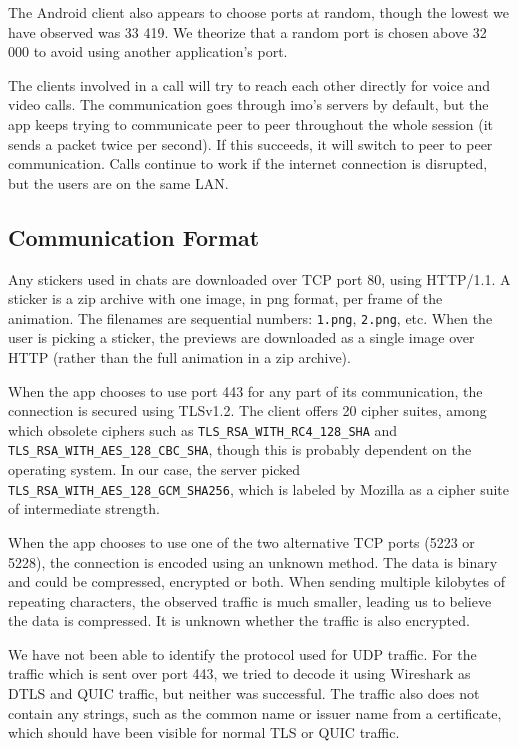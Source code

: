 \documentclass[conference]{IEEEtran}
\begin{document}
The Android client also appears to choose ports at random, though the lowest we
have observed was 33 419. We theorize that a random port is chosen above 32 000
to avoid using another application's port.

The clients involved in a call will try to reach each other directly for voice
and video calls. The communication goes through imo's servers by default, but
the app keeps trying to communicate peer to peer throughout the whole session
(it sends a packet twice per second). If this succeeds, it will switch to peer
to peer communication. Calls continue to work if the internet connection is
disrupted, but the users are on the same LAN.


\subsection{Communication Format}

Any stickers used in chats are downloaded over TCP port 80, using HTTP/1.1. A
sticker is a zip archive with one image, in png format, per frame of the
animation. The filenames are sequential numbers: \texttt{1.png}, \texttt{2.png},
etc. When the user is picking a sticker, the previews are downloaded as a single
image over HTTP (rather than the full animation in a zip archive).

When the app chooses to use port 443 for any part of its communication, the
connection is secured using TLSv1.2. The client offers 20 cipher suites, among
which obsolete ciphers such as \texttt{TLS\_RSA\_WITH\_RC4\_128\_SHA} and
\texttt{TLS\_RSA\_WITH\_AES\_128\_CBC\_SHA}, though this is probably dependent
on the operating system. In our case, the server picked
\texttt{TLS\_RSA\_WITH\_AES\_128\_GCM\_SHA256}, which is labeled by Mozilla as a
cipher suite of intermediate strength\cite{moz-tls}.

When the app chooses to use one of the two alternative TCP ports (5223 or 5228),
the connection is encoded using an unknown method. The data is binary and could
be compressed, encrypted or both. When sending multiple kilobytes of repeating
characters, the observed traffic is much smaller, leading us to believe the
data is compressed. It is unknown whether the traffic is also encrypted.

We have not been able to identify the protocol used for UDP traffic. For the
traffic which is sent over port 443, we tried to decode it using Wireshark as
DTLS and QUIC traffic, but neither was successful. The traffic also does not
contain any strings, such as the common name or issuer name from a certificate,
which should have been visible for normal TLS or QUIC traffic.
\end{document}
